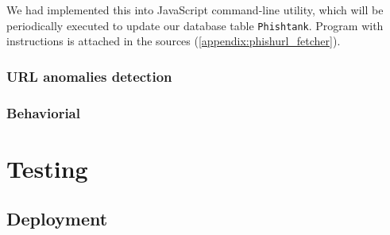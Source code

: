 \documentclass[
  digital, %
  oneside, %
  table,   %
  nolof,     %
  nolot,     %
]{fithesis3}
\begin{document}
We had implemented this into JavaScript command-line utility, which will be periodically executed to update our database table \texttt{Phishtank}. Program with instructions is attached in the sources (\ref{appendix:phishurl_fetcher}).

\subsection{URL anomalies detection}
\subsection{Behaviorial}






\chapter{Testing}

\section{Deployment}
\end{document}
